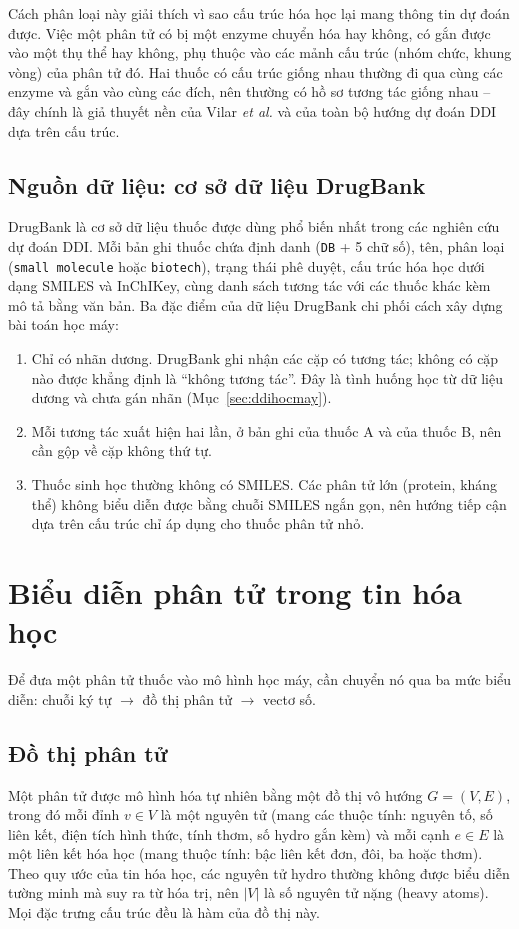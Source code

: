 \documentclass[12pt,a4paper,oneside]{report}
\begin{document}
Cách phân loại này giải thích vì sao cấu trúc hóa học lại mang thông tin
dự đoán được. Việc một phân tử có bị một enzyme chuyển hóa hay không, có gắn
được vào một thụ thể hay không, phụ thuộc vào các mảnh cấu trúc (nhóm chức,
khung vòng) của phân tử đó. Hai thuốc có cấu trúc giống nhau thường đi qua cùng
các enzyme và gắn vào cùng các đích, nên thường có hồ sơ tương tác giống nhau --
đây chính là giả thuyết nền của Vilar \textit{et al.} \cite{vilar2012} và của
toàn bộ hướng dự đoán DDI dựa trên cấu trúc.

\subsection{Nguồn dữ liệu: cơ sở dữ liệu DrugBank}
DrugBank \cite{wishart2018} là cơ sở dữ liệu thuốc được dùng phổ biến nhất
trong các nghiên cứu dự đoán DDI. Mỗi bản ghi thuốc chứa định danh
(\texttt{DB} + 5 chữ số), tên, phân loại (\texttt{small molecule} hoặc
\texttt{biotech}), trạng thái phê duyệt, cấu trúc hóa học dưới dạng SMILES và
InChIKey, cùng danh sách tương tác với các thuốc khác kèm mô tả bằng văn bản.
Ba đặc điểm của dữ liệu DrugBank chi phối cách xây dựng bài toán học máy:
\begin{enumerate}
  \item Chỉ có nhãn dương. DrugBank ghi nhận các cặp có tương
        tác; không có cặp nào được khẳng định là ``không tương tác''. Đây là
        tình huống học từ dữ liệu dương và chưa gán nhãn
        (Mục~\ref{sec:ddihocmay}).
  \item Mỗi tương tác xuất hiện hai lần, ở bản ghi của thuốc A và của
        thuốc B, nên cần gộp về cặp không thứ tự.
  \item Thuốc sinh học thường không có SMILES. Các phân tử lớn
        (protein, kháng thể) không biểu diễn được bằng chuỗi SMILES ngắn gọn,
        nên hướng tiếp cận dựa trên cấu trúc chỉ áp dụng cho thuốc phân tử nhỏ.
\end{enumerate}

\section{Biểu diễn phân tử trong tin hóa học}
\label{sec:bieudienphantu}

Để đưa một phân tử thuốc vào mô hình học máy, cần chuyển nó qua ba mức biểu
diễn: chuỗi ký tự $\rightarrow$ đồ thị phân tử $\rightarrow$ vectơ số.

\subsection{Đồ thị phân tử}
Một phân tử được mô hình hóa tự nhiên bằng một đồ thị vô hướng
$G = (V, E)$, trong đó mỗi đỉnh $v \in V$ là một nguyên tử (mang các thuộc tính:
nguyên tố, số liên kết, điện tích hình thức, tính thơm, số hydro gắn kèm) và
mỗi cạnh $e \in E$ là một liên kết hóa học (mang thuộc tính: bậc liên kết đơn,
đôi, ba hoặc thơm). Theo quy ước của tin hóa học, các nguyên tử hydro thường
không được biểu diễn tường minh mà suy ra từ hóa trị, nên $|V|$ là số
nguyên tử nặng (heavy atoms). Mọi đặc trưng cấu trúc đều là hàm của đồ thị này.
\end{document}
